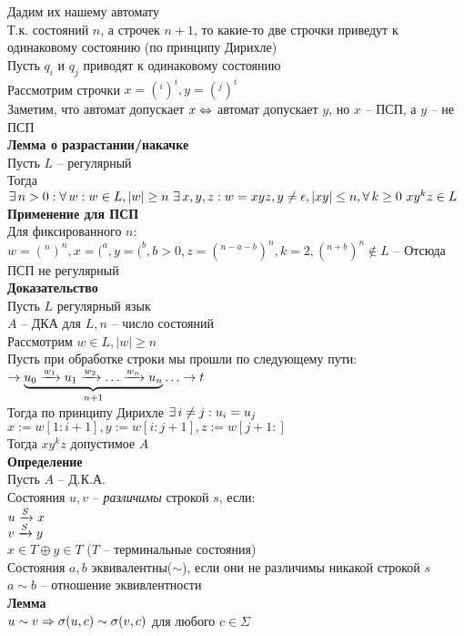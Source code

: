 \documentclass[12pt]{article}
\begin{document}
Дадим их нашему автомату\\
Т.к. состояний $n$, а строчек $n+1$, то какие-то две строчки приведут к одинаковому состоянию (по принципу Дирихле)\\
Пусть $q_i$ и $q_j$ приводят к одинаковому состоянию\\
Рассмотрим строчки $x=(^i)^i, y=(^j)^i$\\
Заметим, что автомат допускает $x \LRto$ автомат допускает $y$, но $x$ -- ПСП, а $y$ -- не ПСП\\
\textbf{Лемма о разрастании/накачке}\\
Пусть $L$ -- регулярный\\
Тогда $\ex n > 0:\fall w: w\in L,|w|\geq n\ \ex x,y,z: w=xyz, y\neq \epsilon, |xy|\leq n, \fall k\geq 0\ xy^kz \in L$\\
\textbf{Применение для ПСП}\\
Для фиксированного $n$: $w=(^n)^n, x = (^a, y=(^b, b > 0, z = (^{n-a-b})^n, k = 2, (^{n+b})^n \not\in L$ -- Отсюда ПСП не регулярный\\
\textbf{Доказательство}\\
Пусть $L$ регулярный язык\\
$A$ -- ДКА для $L, n$ -- число состояний\\
Рассмотрим $w \in L, |w| \geq n$\\
Пусть при обработке строки мы прошли по следующему пути:\\
$\rto \ub{n+1}{u_0 \xrto{w_1} u_1 \xrto{w_2} \ldots \xrto{w_n} u_n} \ldots \rto t$\\
Тогда по принципу Дирихле $\ex i\neq j: u_i = u_j$\\
$x:=w[1:i+1], y:= w[i:j+1], z:= w[j+1:]$\\
Тогда $xy^kz$ допустимое $A$\\
\textbf{Определение}\\
Пусть $A$ -- Д.К.А.\\
Состояния $u, v$ -- \textit{различимы} строкой $s$, если:\\
$u \xrto{S} x$\\
$v \xrto{S} y$\\
$x \in T \oplus y \in T$ ($T$ -- терминальные состояния)\\
Состояния $a, b$ эквивалентны($\sim$), если они не различимы никакой строкой $s$\\
$a \sim b$ -- отношение эквивлентности\\
\textbf{Лемма}\\
$u \sim v \Rto \sigma(u,c) \sim \sigma(v,c)$ для любого $c \in \Sigma$\\
\end{document}
